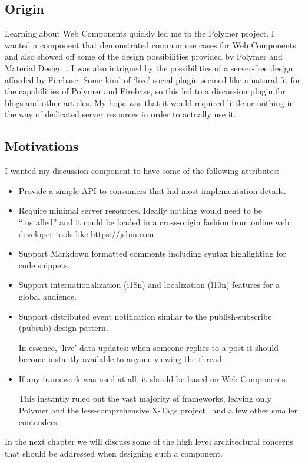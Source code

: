 \subsection{Origin}
Learning about Web Components quickly led me to the Polymer project.
I wanted a component that demonstrated common use cases for Web Components and also showed off some of the design possibilities provided by Polymer and Material Design~\cite{imura2015}.
I was also intrigued by the possibilities of a server-free design afforded by Firebase.
Some kind of `live' social plugin seemed like a natural fit for the capabilities of Polymer and Firebase, so this led to a discussion plugin for blogs and other articles.
My hope was that it would required little or nothing in the way of dedicated server resources in order to actually use it. 

\subsection{Motivations}

I wanted my discussion component to have some of the following attributes:

\begin{itemize}
\item Provide a simple API to consumers that hid most implementation details.

\item Require minimal server resources. Ideally nothing would need to be ``installed'' and it could be loaded in a cross-origin fashion from online web developer tools like \url{https://jsbin.com}.

\item Support Markdown formatted comments including syntax highlighting for code snippets.

\item Support internationalization (i18n) and localization (l10n) features for a global audience.

\item Support distributed event notification similar to the publish-subscribe (pubsub) design pattern. 

In essence, `live' data updates:
when someone replies to a post it should become instantly available to anyone viewing the thread.

\item If any framework was used at all, it should be based on Web Components. 


This instantly ruled out the vast majority of frameworks, 
leaving only Polymer and the less-comprehensive X-Tags project~\cite{x-tagscontributors2015} and a few other smaller contenders.

\end{itemize}

In the next chapter we will discuss some of the high level architectural concerns that should be addressed when designing such a component.
